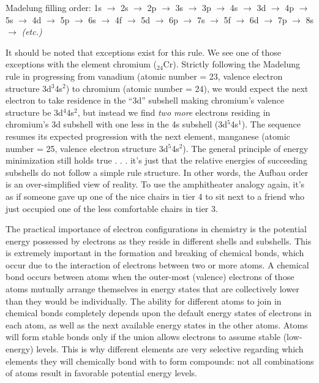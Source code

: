 \noindent
Madelung filling order: 1s $\rightarrow$ 2s $\rightarrow$ 2p $\rightarrow$ 3s $\rightarrow$ 3p $\rightarrow$ 4s $\rightarrow$ 3d $\rightarrow$ 4p $\rightarrow$ 5s $\rightarrow$ 4d $\rightarrow$ 5p $\rightarrow$ 6s $\rightarrow$ 4f $\rightarrow$ 5d $\rightarrow$ 6p $\rightarrow$ 7s $\rightarrow$ 5f $\rightarrow$ 6d $\rightarrow$ 7p $\rightarrow$ 8s $\rightarrow$ \textit{(etc.)}

\vskip 10pt

It should be noted that exceptions exist for this rule.  We see one of those exceptions with the element chromium ($_{24}$Cr).  Strictly following the Madelung rule in progressing from vanadium (atomic number = 23, valence electron structure 3d$^{3}$4s$^{2}$) to chromium (atomic number = 24), we would expect the next electron to take residence in the ``3d'' subshell making chromium's valence structure be 3d$^{4}$4s$^{2}$, but instead we find \textit{two more} electrons residing in chromium's 3d subshell with one less in the 4s subshell (3d$^{5}$4s$^{1}$).  The sequence resumes its expected progression with the next element, manganese (atomic number = 25, valence electron structure 3d$^{5}$4s$^{2}$).  The general principle of energy minimization still holds true . . . it's just that the relative energies of succeeding subshells do not follow a simple rule structure.  In other words, the Aufbau order is an over-simplified view of reality.  To use the amphitheater analogy again, it's as if someone gave up one of the nice chairs in tier 4 to sit next to a friend who just occupied one of the less comfortable chairs in tier 3.

\vskip 10pt

The practical importance of electron configurations in chemistry is the potential energy possessed by electrons as they reside in different shells and subshells.  This is extremely important in the formation and breaking of chemical bonds, which occur due to the interaction of electrons between two or more atoms.  A chemical bond occurs between atoms when the outer-most (valence) electrons of those atoms mutually arrange themselves in energy states that are collectively lower than they would be individually.  The ability for different atoms to join in chemical bonds completely depends upon the default energy states of electrons in each atom, as well as the next available energy states in the other atoms.  Atoms will form stable bonds only if the union allows electrons to assume stable (low-energy) levels.  This is why different elements are very selective regarding which elements they will chemically bond with to form compounds: not all combinations of atoms result in favorable potential energy levels.

